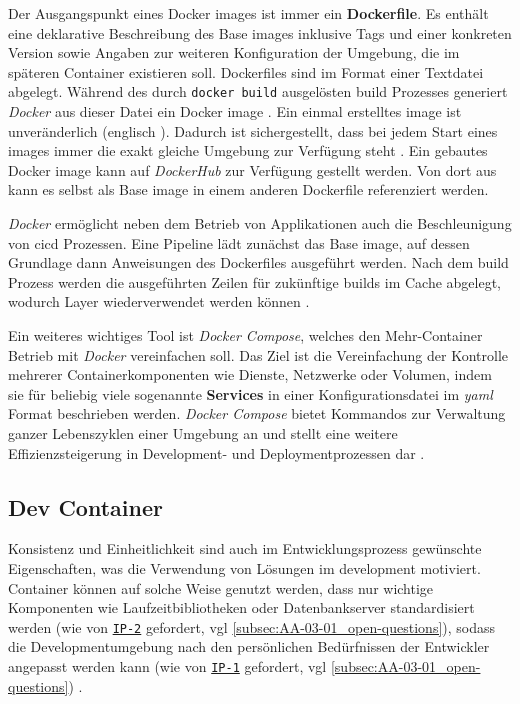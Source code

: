Der Ausgangspunkt eines Docker \Glspl{image} ist immer ein \textbf{Dockerfile}. Es enthält eine deklarative Beschreibung des Base \Glspl{image} inklusive Tags und einer konkreten Version sowie Angaben zur weiteren Konfiguration der Umgebung, die im späteren Container existieren soll. Dockerfiles sind im Format einer Textdatei abgelegt. Während des durch \texttt{docker build} ausgelösten \Gls{build} Prozesses generiert \textit{Docker} aus dieser Datei ein Docker \Gls{image} \cite{020:Assessing-and-Improving-Quality-of-Docker-Artifacts}. Ein einmal erstelltes \Gls{image} ist unveränderlich (englisch ). Dadurch ist sichergestellt, dass bei jedem Start eines \Glspl{image} immer die exakt gleiche Umgebung zur Verfügung steht \cite{014:Managing-Container-based-Software-Development-Environments}. Ein gebautes Docker \Gls{image} kann auf \textit{DockerHub} zur Verfügung gestellt werden. Von dort aus kann es selbst als Base \Gls{image} in einem anderen Dockerfile referenziert werden.

\textit{Docker} ermöglicht neben dem Betrieb von Applikationen auch die Beschleunigung von \Gls{cicd} Prozessen. Eine Pipeline lädt zunächst das Base \Gls{image}, auf dessen Grundlage dann Anweisungen des Dockerfiles ausgeführt werden. Nach dem \Gls{build} Prozess werden die ausgeführten Zeilen für zukünftige \Glspl{build} im Cache abgelegt, wodurch Layer wiederverwendet werden können \cite{022:Automated-Cloud-Infrastructure-Continuous-Integration-and-Continuous-Delivery-using-Docker}.

Ein weiteres wichtiges Tool ist \textit{Docker Compose}, welches den Mehr-Container Betrieb mit \textit{Docker} vereinfachen soll. Das Ziel ist die Vereinfachung der Kontrolle mehrerer Containerkomponenten wie Dienste, Netzwerke oder Volumen, indem sie für beliebig viele sogenannte \textbf{Services} in einer Konfigurationsdatei im \textit{\Gls{yaml}} Format beschrieben werden. \textit{Docker Compose} bietet Kommandos zur Verwaltung ganzer Lebenszyklen einer Umgebung an und stellt eine weitere Effizienzsteigerung in Development- und Deploymentprozessen dar \cite{308:Docker-Compose-Overview}.

\subsection{Dev Container}
\label{subsec:05-01-02_dev-container}

Konsistenz und Einheitlichkeit sind auch im Entwicklungsprozess gewünschte Eigenschaften, was die Verwendung von  Lösungen im \Gls{development} motiviert. Container können auf solche Weise genutzt werden, dass nur wichtige Komponenten wie Laufzeitbibliotheken oder Datenbankserver standardisiert werden (wie von \texttt{\hyperref[sec:AA-02_interview-persons]{IP-2}} gefordert, \acrshort{vgl} \autoref{subsec:AA-03-01_open-questions}), sodass die Developmentumgebung nach den persönlichen Bedürfnissen der Entwickler angepasst werden kann (wie von \texttt{\hyperref[sec:AA-02_interview-persons]{IP-1}} gefordert, \acrshort{vgl} \autoref{subsec:AA-03-01_open-questions}) \cite{014:Managing-Container-based-Software-Development-Environments}.

